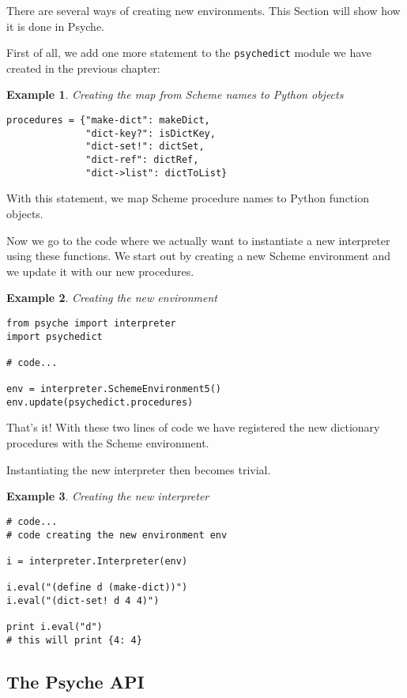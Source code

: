 \documentclass{report}
\newcommand{\file}[1]{\texttt{#1}}
\newtheorem{exmp}{Example}[chapter]
\newenvironment{example}[1]
    {\begin{exmp} \textup{#1}
       \begin{small}}
    {  \end{small}
     \end{exmp}}
\begin{document}
There are several ways of creating new environments. This Section will
show how it is done in Psyche.

First of all, we add one more statement to the \file{psychedict}
module we have created in the previous chapter:

\begin{example}{Creating the map from Scheme names to Python objects}
\begin{verbatim}
procedures = {"make-dict": makeDict,
              "dict-key?": isDictKey,
              "dict-set!": dictSet,
              "dict-ref": dictRef,
              "dict->list": dictToList}  
\end{verbatim}
\end{example}

With this statement, we map Scheme procedure names to Python function
objects. 

Now we go to the code where we actually want to instantiate a new
interpreter using these functions. We start out by creating a new
Scheme environment and we update it with our new procedures.

\begin{example}{Creating the new environment}
\begin{verbatim}
from psyche import interpreter
import psychedict

# code...

env = interpreter.SchemeEnvironment5()
env.update(psychedict.procedures)
\end{verbatim}
\end{example}

That's it! With these two lines of code we have registered the new
dictionary procedures with the Scheme environment.

Instantiating the new interpreter then becomes trivial.

\begin{example}{Creating the new interpreter}
\begin{verbatim}
# code...
# code creating the new environment env

i = interpreter.Interpreter(env)

i.eval("(define d (make-dict))")
i.eval("(dict-set! d 4 4)")

print i.eval("d")
# this will print {4: 4}
\end{verbatim}
\end{example}



%
%
\begin{latexonly} %
\part{The Psyche API}
\end{latexonly}
\end{document}

